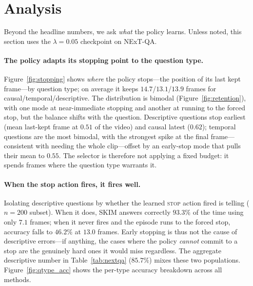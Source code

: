 \documentclass{article}
\begin{document}
\section{Analysis}
\label{sec:analysis}

Beyond the headline numbers, we ask \emph{what} the policy learns. Unless noted, this
section uses the $\lambda{=}0.05$ checkpoint on NExT-QA.

\paragraph{The policy adapts its stopping point to the question type.}
Figure~\ref{fig:stopping} shows \emph{where} the policy stops---the position of its
last kept frame---by question type; on average it keeps $14.7$/$13.1$/$13.9$ frames for
causal/temporal/descriptive. The distribution is bimodal (Figure~\ref{fig:retention}),
with one mode at near-immediate stopping and another at running to the forced stop,
but the balance shifts with the question. Descriptive
questions stop earliest (mean last-kept frame at $0.51$ of the video) and causal latest
($0.62$); temporal questions are the most bimodal, with the strongest spike at the final
frame---consistent with needing the whole clip---offset by an early-stop mode that pulls
their mean to $0.55$. The selector is therefore not applying a fixed budget: it spends
frames where the question type warrants it.

\paragraph{When the stop action fires, it fires well.}
Isolating descriptive questions by whether the learned \textsc{stop} action fired is
telling ($n{=}200$ subset). When it does, SKIM answers correctly $93.3\%$ of the time
using only $7.1$ frames; when it never fires and the episode runs to the forced stop,
accuracy falls to $46.2\%$ at $13.0$ frames. Early stopping is thus not the cause of
descriptive errors---if anything, the cases where the policy \emph{cannot} commit to a
stop are the genuinely hard ones it would miss regardless. The aggregate descriptive
number in Table~\ref{tab:nextqa} ($85.7\%$) mixes these two populations.
Figure~\ref{fig:qtype_acc} shows the per-type accuracy breakdown across all methods.
\end{document}
